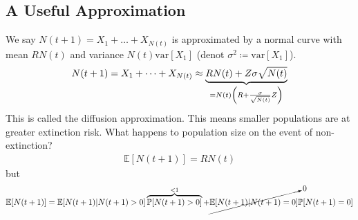 \documentclass{article}
\newcommand{\prob}{\mathbb{P}}
\newcommand{\vari}{\text{var}}
\newcommand{\expec}{\mathbb{E}}
\begin{document}
        \subsection{A Useful Approximation}
            We say $N(t+1) = X_1 + \dots + X_{N(t)}$ is approximated by a normal curve with mean $RN(t)$ and variance $N(t)\vari[X_1]$ (denot $\sigma^2 \coloneqq \vari[X_1]$).
            \begin{align*}
                N(t+1) = X_1 + \dots + X_{N(t)} \approx \underbrace{RN(t) + Z\sigma\sqrt{N(t)}}_{= N(t)\qty(R + \frac{\sigma}{\sqrt{N(t)}}Z)}
            \end{align*}
            This is called the diffusion approximation.  This means smaller populations are at greater extinction risk.  What happens to population size on the event of non-extinction?
            \begin{align}
                \expec[N(t+1)] = RN(t)
            \end{align}
            but
            \begin{align}
                \expec[N(t+1)] = \expec[N(t+1)|N(t+1) > 0]\overbrace{\prob[N(t+1)>0]}^{<1} + \cancelto{0}{\expec[N(t+1)|N(t+1)=0]}\prob[N(t+1)=0]
            \end{align}
\end{document}
